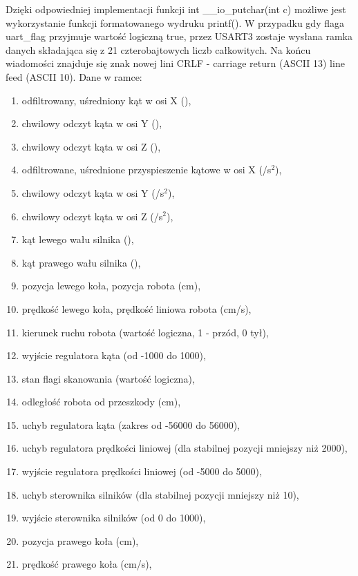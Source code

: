 \documentclass[a4paper,12pt,twoside,openany]{report}
\begin{document}
Dzięki odpowiedniej implementacji funkcji int \_\_io\_putchar(int c) możliwe jest wykorzystanie funkcji formatowanego wydruku printf(). W przypadku gdy flaga uart\_flag przyjmuje wartość logiczną true, przez USART3 zostaje wysłana ramka danych składająca się z 21 czterobajtowych liczb całkowitych. Na końcu wiadomości znajduje się znak nowej lini CRLF - carriage return (ASCII 13) line feed (ASCII 10). Dane w ramce:
\begin{enumerate}
\item odfiltrowany, uśredniony kąt w osi X (\textdegree),
\item chwilowy odczyt kąta w osi Y (\textdegree),
\item chwilowy odczyt kąta w osi Z (\textdegree),
\item odfiltrowane, uśrednione przyspieszenie kątowe w osi X (\textdegree/s$^2$),
\item chwilowy odczyt kąta w osi Y (\textdegree/s$^2$),
\item chwilowy odczyt kąta w osi Z (\textdegree/s$^2$),
\item kąt lewego wału silnika (\textdegree),
\item kąt prawego wału silnika (\textdegree),
\item pozycja lewego koła, pozycja robota (cm),
\item prędkość lewego koła, prędkość liniowa robota (cm/s),
\item kierunek ruchu robota (wartość logiczna, 1 - przód, 0 tył),
\item wyjście regulatora kąta (od -1000 do 1000),
\item stan flagi skanowania (wartość logiczna),
\item odległość robota od przeszkody (cm),
\item uchyb regulatora kąta (zakres od -56000 do 56000),
\item uchyb regulatora prędkości liniowej (dla stabilnej pozycji mniejszy niż 2000),
\item wyjście regulatora prędkości liniowej (od -5000 do 5000),
\item uchyb sterownika silników (dla stabilnej pozycji mniejszy niż 10),
\item wyjście sterownika silników (od 0 do 1000),
\item pozycja prawego koła (cm),
\item prędkość prawego koła (cm/s),
\end{enumerate}
\end{document}
